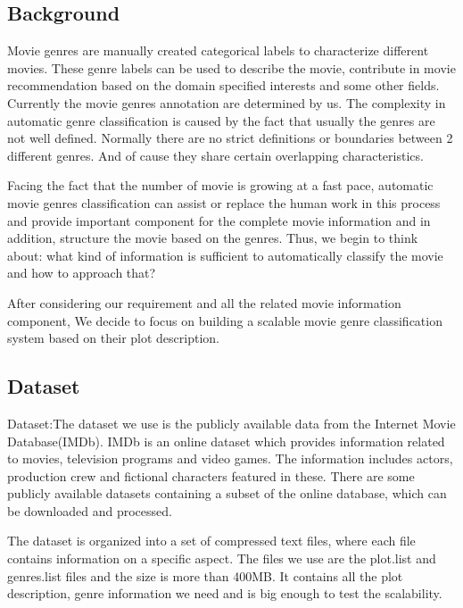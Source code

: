 \documentclass{vldb}
\begin{document}
\subsection{Background}
Movie genres are manually created categorical labels to characterize different movies. These genre labels can be used to describe the movie, contribute in movie recommendation based on the domain specified interests and some other fields. Currently the movie genres annotation are determined by us. The complexity in automatic genre classification is caused by the fact that usually the genres are not well  defined. Normally there are no strict definitions or boundaries between 2 different genres.  And of cause they share certain overlapping characteristics.
\par Facing the fact that the number of movie is growing at a fast pace, automatic movie genres classification can assist or replace the human work in this process and provide important component for the complete movie information and in addition, structure the movie based on the genres. Thus, we begin to think about: what kind of information is sufficient to automatically classify the movie and how to approach that?
\par After considering our requirement and all the related movie information component, We decide to focus on building a scalable movie genre classification system based on their plot description. 

\subsection{Dataset} 
Dataset:The dataset we use is the publicly available data from the Internet Movie Database(IMDb). IMDb is an online dataset which provides information related to movies, television programs and video games. The information includes actors, production crew and fictional characters featured in these. There are some publicly available datasets containing a subset of the online database, which can be downloaded and processed. 
\par The dataset is organized into a set of compressed text files, where each file contains information on a specific aspect. The files we use are the plot.list and genres.list files and the size is more than 400MB. It contains all the plot description, genre information we need and is big enough to test the scalability.
\end{document}
